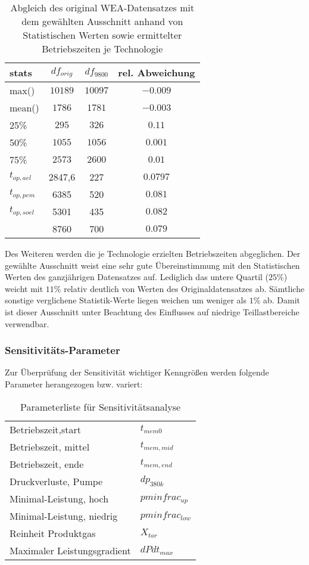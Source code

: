 \documentclass[onecolumn,10pt,titlepage]{article}
\begin{document}
\begin{table}[H]
	\caption{Abgleich des original WEA-Datensatzes mit dem gewählten Ausschnitt anhand von Statistischen Werten sowie ermittelter Betriebszeiten je Technologie}
	\begin{tabular}{l|ccc}

		stats& $df_{orig}$ & $df_{9800}$ &rel. Abweichung\\
		\hline
		\hline
		max()			& $10189$ & $10097$& $-0.009$\\
		\hline
		mean()			&$1786$  & $1781$ &$-0.003$\\
		\hline
		25\%			&$295$  & $326$ & $0.11$\\
		\hline
		50\%			& $1055$ & $1056$& $0.001$\\
		\hline
		75\%			& $2573$ &  $2600$&$0.01$\\
		\hline

		$t_{op,ael}$	& 2847,6 & 227& $0.0797$\\
		\hline
		$t_{op,pem}$	& 6385 & 520& $0.081$\\
		\hline
		$t_{op,soel}$	& 5301 & 435& $0.082$\\
		\hline
		& 8760 & 700& $0.079$\\
	\end{tabular}
	\label{tab:WEA_slice_stat_vgl}
\end{table}
Des Weiteren werden die je Technologie erzielten Betriebszeiten abgeglichen.
Der gewählte Ausschnitt weist eine sehr gute Übereinstimmung mit den Statistischen Werten des ganzjährigen Datensatzes auf. Lediglich das untere Quartil ($25\%$) weicht mit $11\%$ relativ deutlich von Werten des Originaldatensatzes ab. Sämtliche sonstige verglichene Statistik-Werte liegen weichen um weniger als $1\%$ ab. Damit ist dieser Ausschnitt unter Beachtung des Einflusses auf niedrige Teillastbereiche verwendbar.

\subsubsection{Sensitivitäts-Parameter}
Zur Überprüfung der Sensitivität wichtiger Kenngrößen werden folgende Parameter herangezogen bzw. variert:
\begin{table}[H]
	\caption{Parameterliste für Sensitivitätsanalyse}
	\begin{tabular}{ll}
		Betriebszeit,start	&$t_{mem0}$ \\
		Betriebszeit, mittel	&$t_{mem,mid}$\\
		Betriebszeit, ende 		&$t_{mem,end}$\\
		Druckverluste, Pumpe 	&$dp_{380k}$\\
		Minimal-Leistung, hoch 	&$pminfrac_{up}$\\
		Minimal-Leistung, niedrig &$pminfrac_{low}$\\
		Reinheit Produktgas &$X_{tar}$\\
		Maximaler Leistungsgradient &$dPdt_{max}$\\
	\end{tabular}
	\label{tab:sens_params}
\end{table}
\end{document}

